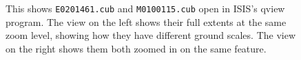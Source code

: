 \begin{figure}[b!]
\begin{minipage}{5.2in}
\end{minipage}
\hfill
\begin{minipage}{1.3in}
\caption[P19 images open in qview zoomed in]{
    \label{p19-images}
    This shows \texttt{E0201461.cub} and \texttt{M0100115.cub} open in
	ISIS's qview program.  The view on the left shows their full extents
	at the same zoom level, showing how they have different ground scales.
	The view on the right shows them both zoomed in on the same feature.
    }
\end{minipage}
\end{figure}

% 
% 
% 
% 
% 
% 
% 
% 
% 
% 
% 
% 
